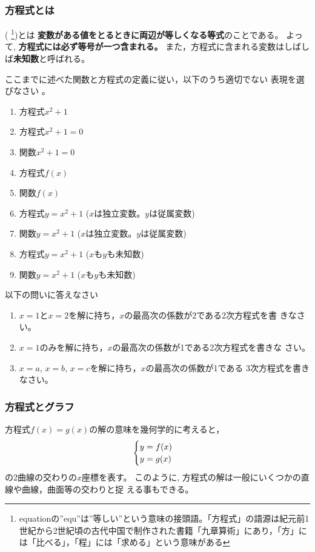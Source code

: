 \documentclass[twocolumn,11pt]{jarticle}
\begin{document}
\subsubsection{方程式とは}

(
\footnote{equationの''equ''は''等しい''という意味の接頭語。「方程式」の語源は紀元前1世紀から2世紀頃の古代中国で制作された書籍「九章算術」にあり，「方」には「比べる」，「程」には「求める」という意味がある})とは
\textbf{変数がある値をとるときに両辺が等しくなる等式}のことである。
よって, \textbf{方程式には必ず等号が一つ含まれる。}
また，方程式に含まれる変数はしばしば\textbf{未知数}と呼ばれる。

\nquestion
ここまでに述べた関数と方程式の定義に従い，以下のうち適切でない
表現を選びなさい
。
\begin{enumerate}
\item 方程式$x^2+1$
\item 方程式$x^2+1=0$
\item 関数$x^2+1=0$
\item 方程式$f(x)$
\item 関数$f(x)$
\item 方程式$y=x^2+1$ ($x$は独立変数。$y$は従属変数)
\item 関数$y=x^2+1$ ($x$は独立変数。$y$は従属変数)
\item 方程式$y=x^2+1$ ($x$も$y$も未知数)
\item 関数$y=x^2+1$ ($x$も$y$も未知数)
\end{enumerate}

\nquestion
以下の問いに答えなさい
\begin{enumerate}
\item $x=1$と$x=2$を解に持ち，$x$の最高次の係数が2である2次方程式を書
  きなさい。
\item $x=1$のみを解に持ち，$x$の最高次の係数が1である2次方程式を書きな
  さい。
\item $x=a$, $x=b$, $x=c$を解に持ち，$x$の最高次の係数が1である
  3次方程式を書きなさい。
\end{enumerate}

\subsubsection{方程式とグラフ}

方程式$f(x)=g(x)$の解の意味を幾何学的に考えると，
\begin{align}
  \begin{cases}
    y=f(x)\\
    y=g(x)
  \end{cases}\notag
\end{align}
の2曲線の交わりの$x$座標を表す。
このように, 方程式の解は一般にいくつかの直線や曲線，曲面等の交わりと捉
える事もできる。
\end{document}
